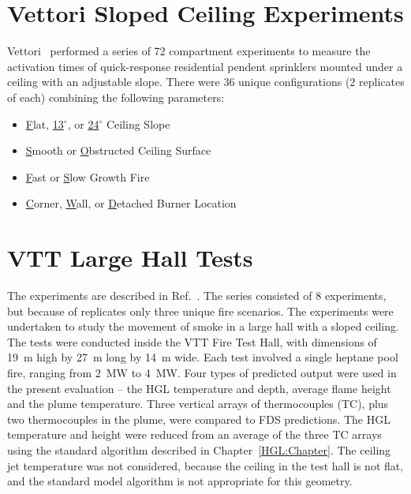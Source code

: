 \section{Vettori Sloped Ceiling Experiments}

Vettori~\cite{Vettori:2} performed a series of 72 compartment experiments to measure the activation times of quick-response residential pendent sprinklers mounted under a ceiling with an adjustable slope. There were 36 unique configurations (2 replicates of each) combining the following parameters:
\begin{itemize}
\item \underline{F}lat, \underline{13}$^\circ$, or \underline{24}$^\circ$ Ceiling Slope
\item \underline{S}mooth or \underline{O}bstructed Ceiling Surface
\item \underline{F}ast or \underline{S}low Growth Fire
\item \underline{C}orner, \underline{W}all, or \underline{D}etached Burner Location
\end{itemize}


\clearpage


\section{VTT Large Hall Tests}

The experiments are described in Ref.~\cite{Hostikka:VTT2104}. The series consisted of 8 experiments, but because of replicates only three unique fire
scenarios. The experiments were undertaken to study the movement of smoke in a large hall with a sloped ceiling. The tests were conducted inside the
VTT Fire Test Hall, with dimensions of 19~m high by 27~m long by 14~m wide. Each test involved a single heptane pool fire, ranging from 2~MW to 4~MW.
Four types of predicted output were used in the present evaluation -- the HGL temperature and depth, average flame height and the plume
temperature. Three vertical arrays of thermocouples (TC), plus two thermocouples in the plume, were compared to FDS predictions. The HGL
temperature and height were reduced from an average of the three TC
arrays using the standard algorithm described in
Chapter~\ref{HGL:Chapter}. The ceiling jet temperature was not
considered, because the ceiling in the test hall is not flat, and the
standard model algorithm is not appropriate for this geometry.

